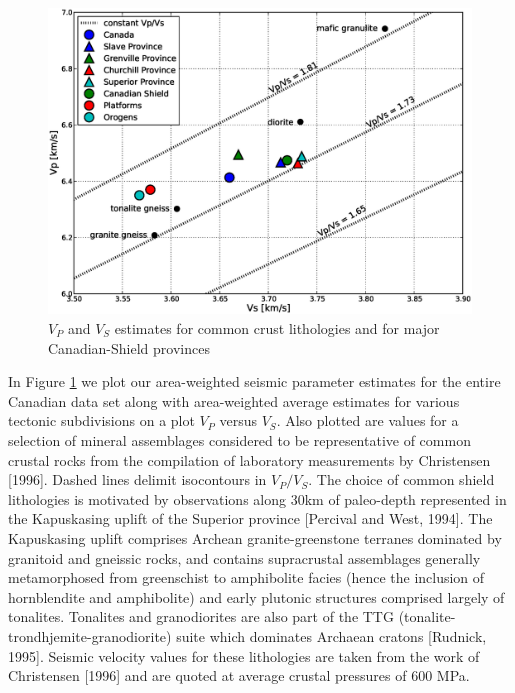 \documentclass[draft, 12pt]{article}
\begin{document}
\begin{figure}
  \centering
  \includegraphics[width=\textwidth]{lithology}
  \caption{$V_P$ and $V_S$ estimates for common crust lithologies and for major Canadian-Shield provinces}
  \label{fig:lith}
\end{figure}


In Figure \ref{fig:lith} we plot our area-weighted seismic parameter estimates for the entire Canadian data set along with area-weighted average estimates for various tectonic subdivisions on a plot $V_P$ versus $V_S$. Also plotted are values for a selection of mineral assemblages considered to be representative of common crustal rocks from the compilation of laboratory measurements by Christensen [1996]. Dashed lines delimit isocontours in $V_P/V_S$. The choice of common shield lithologies is motivated by observations along 30km of paleo-depth represented in the Kapuskasing uplift of the Superior province [Percival and West, 1994]. The Kapuskasing uplift comprises Archean granite-greenstone terranes dominated by granitoid and gneissic rocks, and contains supracrustal assemblages generally metamorphosed from greenschist to amphibolite facies (hence the inclusion of hornblendite and amphibolite) and early plutonic structures comprised largely of tonalites. Tonalites and granodiorites are also part of the TTG (tonalite-trondhjemite-granodiorite) suite which dominates Archaean cratons [Rudnick, 1995]. Seismic velocity values for these lithologies are taken from the work of Christensen [1996] and are quoted at average crustal pressures of 600 MPa.
\end{document}
